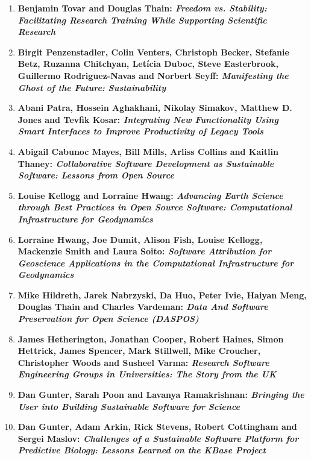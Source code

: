 \documentclass[11pt, oneside]{amsart}
\begin{document}
\begin{enumerate}
\item \textbf{Benjamin Tovar and Douglas Thain: \textit{Freedom vs. Stability:
Facilitating Research Training While Supporting Scientific Research}}

\item \textbf{Birgit Penzenstadler, Colin Venters, Christoph Becker, Stefanie
Betz, Ruzanna Chitchyan, Letícia Duboc, Steve Easterbrook, Guillermo
Rodriguez-Navas and Norbert Seyff: \textit{Manifesting the Ghost of the Future:
Sustainability}}

\item \textbf{Abani Patra, Hossein Aghakhani, Nikolay Simakov, Matthew D. Jones
and Tevfik Kosar: \textit{Integrating New Functionality Using Smart Interfaces to
Improve Productivity of Legacy Tools}}

\item \textbf{Abigail Cabunoc Mayes, Bill Mills, Arliss Collins and Kaitlin
Thaney: \textit{Collaborative Software Development as Sustainable Software: Lessons
from Open Source}}

\item \textbf{Louise Kellogg and Lorraine Hwang: \textit{Advancing Earth Science
through Best Practices in Open Source Software: Computational Infrastructure
for Geodynamics}}

\item \textbf{Lorraine Hwang, Joe Dumit, Alison Fish, Louise Kellogg, Mackenzie
Smith and Laura Soito: \textit{Software Attribution for Geoscience Applications in the
Computational Infrastructure for Geodynamics}}

\item \textbf{Mike Hildreth, Jarek Nabrzyski, Da Huo, Peter Ivie, Haiyan Meng,
Douglas Thain and Charles Vardeman: \textit{Data And Software Preservation for Open
Science (DASPOS)}}

\item \textbf{James Hetherington, Jonathan Cooper, Robert Haines, Simon
Hettrick, James Spencer, Mark Stillwell, Mike Croucher, Christopher Woods and
Susheel Varma: \textit{Research Software Engineering Groups in Universities: The Story
from the UK}}

\item \textbf{Dan Gunter, Sarah Poon and Lavanya Ramakrishnan: \textit{Bringing the
User into Building Sustainable Software for Science}}

\item \textbf{Dan Gunter, Adam Arkin, Rick Stevens, Robert Cottingham and
Sergei Maslov: \textit{Challenges of a Sustainable Software Platform for Predictive
Biology: Lessons Learned on the KBase Project}}


\end{enumerate}
\end{document}
